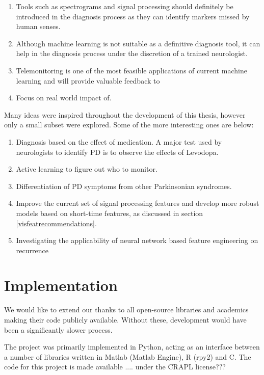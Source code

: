 \documentclass[12pt, twoside]{book}
\begin{document}
\begin{enumerate}[noitemsep, topsep=-10pt]
	\item Tools such as spectrograms and signal processing should definitely be introduced in the diagnosis process as they can identify markers missed by human senses.
	\item Although machine learning is not suitable as a definitive diagnosis tool, it can help in the diagnosis process under the discretion of a trained neurologist.
	\item Telemonitoring is one of the most feasible applications of current machine learning and will provide valuable feedback to 
	\item Focus on real world impact of.
\end{enumerate}


Many ideas were inspired throughout the development of this thesis, however only a small subset were explored. Some of the more interesting ones are below:


\begin{enumerate}[noitemsep, topsep=-10pt]
	\item Diagnosis based on the effect of medication. A major test used by neurologists to identify PD is to observe the effects of Levodopa.
	\item Active learning to figure out who to monitor.
	\item Differentiation of PD symptoms from other Parkinsonian syndromes.
	\item Improve the current set of signal processing features and develop more robust models based on short-time features, as discussed in section \ref{visfeatrecommendations}.
	\item Investigating the applicability of neural network based feature engineering on recurrence 
\end{enumerate}



\section{Implementation}
\label{implementation}
We would like to extend our thanks to all open-source libraries and academics making their code publicly available. Without these, development would have been a significantly slower process. 

The project was primarily implemented in Python, acting as an interface between a number of libraries written in Matlab (Matlab Engine), R (rpy2) and C. The code for this project is made available .... under the CRAPL license???
\end{document}
